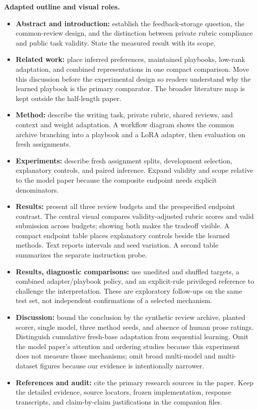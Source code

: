 \documentclass[10pt,letterpaper]{article}
\newcommand{\claim}[2]{#2}
\begin{document}
\textbf{Adapted outline and visual roles.}
\begin{itemize}
\item \claim{N02}{\textbf{Abstract and introduction:} establish the feedback-storage question,
the common-review design, and the distinction between private rubric compliance
and public task validity. State the measured result with its scope.}
\item \claim{N03}{\textbf{Related work:} place inferred preferences, maintained playbooks,
low-rank adaptation, and combined representations in one compact comparison.
Move this discussion before the experimental design so readers understand why
the learned playbook is the primary comparator. The broader literature map is
kept outside the half-length paper.}
\item \claim{N04}{\textbf{Method:} describe the writing task, private rubric, shared reviews,
and context and weight adaptation. A workflow diagram shows the common archive
branching into a playbook and a LoRA adapter, then evaluation on fresh assignments.}
\item \claim{N05}{\textbf{Experiments:} describe fresh assignment splits, development
selection, explanatory controls, and paired inference. Expand validity and scope relative
to the model paper because the composite endpoint needs explicit denominators.}
\item \claim{N06}{\textbf{Results:} present all three review budgets and the prespecified
endpoint contrast. The central visual compares validity-adjusted rubric scores
and valid submission across budgets; showing both makes the tradeoff visible.
A compact endpoint table places explanatory controls beside the learned methods.
Text reports intervals and seed variation. A second table summarizes the separate
instruction probe.}
\item \claim{N07}{\textbf{Results, diagnostic comparisons:} use unedited and shuffled targets, a combined
adapter/playbook policy, and an explicit-rule privileged reference to challenge
the interpretation. These are exploratory follow-ups on the same test set,
not independent confirmations of a selected mechanism.}
\item \claim{N08}{\textbf{Discussion:} bound the conclusion by the synthetic review archive,
planted scorer, single model, three method seeds, and absence of human prose
ratings. Distinguish cumulative fresh-base adaptation from sequential learning.
Omit the model paper's attention and ordering studies because this experiment
does not measure those mechanisms; omit broad multi-model and multi-dataset
figures because our evidence is intentionally narrower.}
\item \claim{N09}{\textbf{References and audit:} cite the primary research sources in the
paper. Keep the detailed evidence, source locators, frozen implementation,
response transcripts, and claim-by-claim justifications in the companion files.}
\end{itemize}
\end{document}
